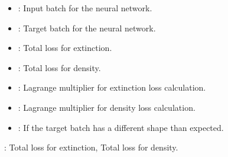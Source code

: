 \documentclass[letterpaper,10pt,english]{sphinxmanual}
\begin{document}
\begin{fulllineitems}
\begin{fulllineitems}
\begin{description}
\begin{itemize}
\item {} 
\sphinxAtStartPar
{}: Input batch for the neural network.

\item {} 
\sphinxAtStartPar
{}: Target batch for the neural network.

\item {} 
\sphinxAtStartPar
{}: Total loss for extinction.

\item {} 
\sphinxAtStartPar
{}: Total loss for density.

\item {} 
\sphinxAtStartPar
{}: Lagrange multiplier for extinction loss calculation.

\item {} 
\sphinxAtStartPar
{}: Lagrange multiplier for density loss calculation.

\end{itemize}

\begin{itemize}
\item {} 
\sphinxAtStartPar
{}: If the target batch has a different shape than expected.

\end{itemize}

\sphinxAtStartPar
{}: Total loss for extinction, Total loss for density.

\end{description}

\end{fulllineitems}



\end{fulllineitems}
\end{document}
